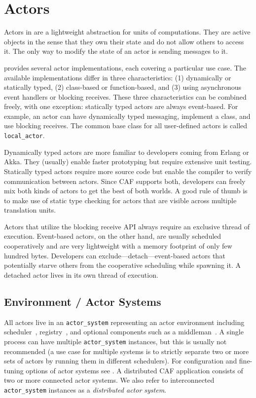 \section{Actors}
\label{actor}

Actors in \lib are a lightweight abstraction for units of computations. They
are active objects in the sense that they own their state and do not allow
others to access it. The only way to modify the state of an actor is sending
messages to it.

\lib provides several actor implementations, each covering a particular use
case. The available implementations differ in three characteristics: (1)
dynamically or statically typed, (2) class-based or function-based, and (3)
using asynchronous event handlers or blocking receives. These three
characteristics can be combined freely, with one exception: statically typed
actors are always event-based. For example, an actor can have dynamically typed
messaging, implement a class, and use blocking receives. The common base class
for all user-defined actors is called \lstinline^local_actor^.

Dynamically typed actors are more familiar to developers coming from Erlang or
Akka. They (usually) enable faster prototyping but require extensive unit
testing. Statically typed actors require more source code but enable the
compiler to verify communication between actors. Since CAF supports both,
developers can freely mix both kinds of actors to get the best of both worlds.
A good rule of thumb is to make use of static type checking for actors that are
visible across multiple translation units.

Actors that utilize the blocking receive API always require an exclusive thread
of execution. Event-based actors, on the other hand, are usually scheduled
cooperatively and are very lightweight with a memory footprint of only few
hundred bytes. Developers can exclude---detach---event-based actors that
potentially starve others from the cooperative scheduling while spawning it. A
detached actor lives in its own thread of execution.

\subsection{Environment / Actor Systems}
\label{actor-system}

All actors live in an \lstinline^actor_system^ representing an actor
environment including scheduler~, registry~, and
optional components such as a middleman~. A single process can
have multiple \lstinline^actor_system^ instances, but this is usually not
recommended (a use case for multiple systems is to strictly separate two or
more sets of actors by running them in different schedulers). For configuration
and fine-tuning options of actor systems see . A
distributed CAF application consists of two or more connected actor systems. We
also refer to interconnected \lstinline^actor_system^ instances as a
\emph{distributed actor system}.

